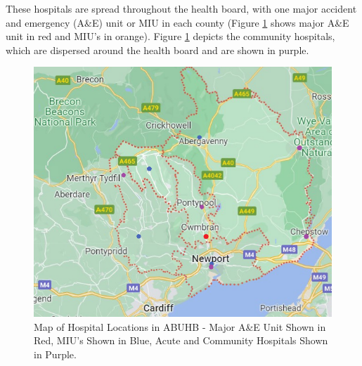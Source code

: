 \documentclass[../thesis.tex]{subfiles}
\begin{document}
\begin{table}[h!]
    \centering{}
    \caption{Type and Names of Hospitals Located in ABUHB}
    \label{tab:hospitals}
\end{table}

These hospitals are spread throughout the health board, with one major accident and emergency (A\&E) unit or MIU in each county (Figure \ref{fig:abuhblocations1} shows major A\&E unit in red and MIU's in orange). Figure \ref{fig:abuhblocations1} depicts the community hospitals, which are dispersed around the health board and are shown in purple.

\begin{figure}[h!]
    \centering
    \includegraphics[scale=0.9
]{Chapters/Chapter1/Figures/ABUHBmap3.png}
    \caption{Map of Hospital Locations in ABUHB - Major A\&E Unit Shown in Red, MIU's Shown in Blue, Acute and Community Hospitals Shown in Purple.}
    \label{fig:abuhblocations1}
\end{figure}
\end{document}
